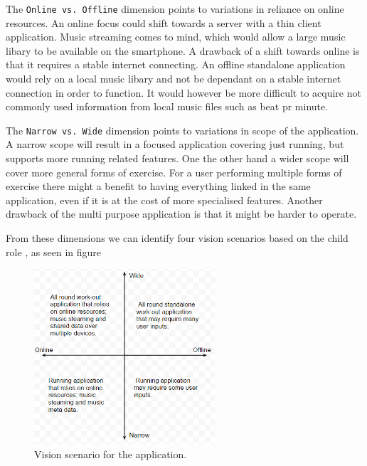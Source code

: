 The \texttt{Online vs. Offline} dimension points to variations in reliance on online resources. An online focus could shift  towards a server with a thin client application. Music streaming comes to mind, which would allow a large music libary to be available on the smartphone. A drawback of a shift towards online is that it requires a stable internet connecting. An offline standalone application would rely on a local music libary and not be dependant on a stable internet connection in order to function. It would however be more difficult to acquire not commonly used information from local music files such as beat pr minute.

The \texttt{Narrow vs. Wide} dimension points to variations in scope of the application. A narrow scope will result in a focused application covering just running, but supports more running related features. One the other hand a wider scope will cover more general forms of exercise. For a user performing multiple forms of exercise there might a benefit to having everything linked in the same application, even if it is at the cost of more specialised features. Another drawback of the multi purpose application is that it might be harder to operate.



From these dimensions we can identify four vision scenarios based on the child role  \cite[ pp. 132-134]{essence}, as seen in figure 

\begin{figure}[h!]
  \centering
    \includegraphics[width=0.6\textwidth]{Images/axis1.PNG}
    \caption{Vision scenario for the application.}
    \label{fig:axis1}
\end{figure}

